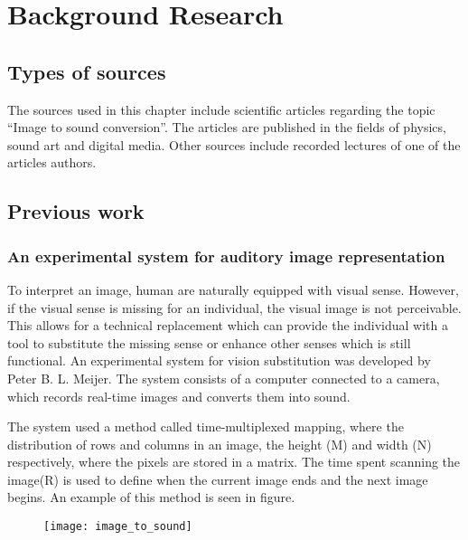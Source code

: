 \chapter{Background Research}\label{ch:bgresearch}



\section{Types of sources}\label{sec:typesofsources} 
The sources used in this chapter include scientific articles regarding the topic “Image to sound conversion”. The articles are published in the fields of physics, sound art and digital media. Other sources include recorded lectures of one of the articles authors.

\section{Previous work}\label{sec:previouswork}

\subsection{An experimental system for auditory image representation}\label{sec:experimentalsystem}
To interpret an image, human are naturally equipped with visual sense. However, if the visual sense is missing for an individual, the visual image is not perceivable. This allows for a technical replacement which can provide the individual with a tool to substitute the missing sense or enhance other senses which is still functional. An experimental system for vision substitution was developed by Peter B. L. Meijer. The system consists of a computer connected to a camera, which records real-time images and converts them into sound. 

The system used a method called time-multiplexed mapping, where the distribution of rows and columns in an image, the height (M) and width (N) respectively, where the pixels are stored in a matrix. The time spent scanning the image(R) is used to define when the current image ends and the next image begins. An example of this method is seen in figure. 

\begin{figure}[!h] 
\centering
\texttt{[image: image\_to\_sound]}
\caption{\label{fig:image_to_sound}}
\end{figure}
  
